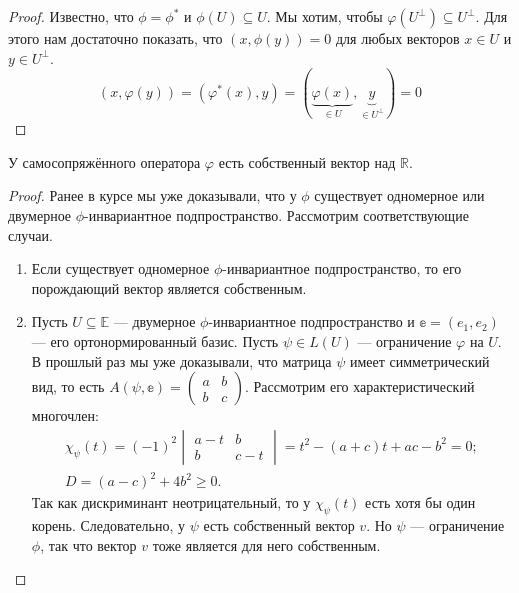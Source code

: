 \begin{proof}	 
	Известно, что $\phi = \phi^*$ и $\phi(U) \subseteq U$.
	Мы хотим, чтобы $\varphi(U^\perp) \subseteq U^\perp$. Для этого нам достаточно показать, что $(x, \phi(y)) = 0$ для любых векторов $x \in U$ и $y \in U^\perp$. 
	\[
		(x,\varphi(y)) = (\varphi^*(x), y) = (\underbrace{\varphi(x)}_{\in U}, \underbrace{y}_{\in U^\perp}) = 0
	\]
\end{proof}

\begin{Suggestion}
	У самосопряжённого оператора $\varphi$ есть собственный вектор над $\mathbb{R}$. 
\end{Suggestion}

\begin{proof}
	Ранее в курсе мы уже доказывали, что у $\phi$ существует одномерное или двумерное $\phi$-инвариантное подпространство. Рассмотрим соответствующие случаи.
	
\begin{enumerate}
	\item Если существует одномерное $\phi$-инвариантное подпространство, то его порождающий вектор является собственным.
	
	\item Пусть $U \subseteq \mathbb{E}$ --- двумерное $\phi$-инвариантное подпространство и $\mathbb{e} = (e_1, e_2)$ --- его ортонормированный базис. Пусть $\psi \in L(U)$ --- ограничение $\varphi$ на $U$. В прошлый раз мы уже доказывали, что матрица $\psi$ имеет симметрический вид, то есть $A(\psi, \mathbb{e}) = \begin{pmatrix}
		a& b\\
		b& c
	\end{pmatrix}$.
	Рассмотрим его характеристический многочлен:
	\begin{gather*}
	\chi_\psi(t) = (-1)^2\begin{vmatrix}
	a-t& b\\
	b& c-t
	\end{vmatrix} = t^2 - (a + c)t + ac - b^2 = 0;\\
	D = (a - c)^2 + 4b^2 \geqslant 0.
	\end{gather*}
	Так как дискриминант неотрицательный, то у $\chi_\psi(t)$ есть хотя бы один корень. Следовательно, у $\psi$ есть собственный вектор $v$. Но $\psi$ --- ограничение $\phi$, так что вектор $v$ тоже является для него собственным.
\end{enumerate}

\end{proof}


